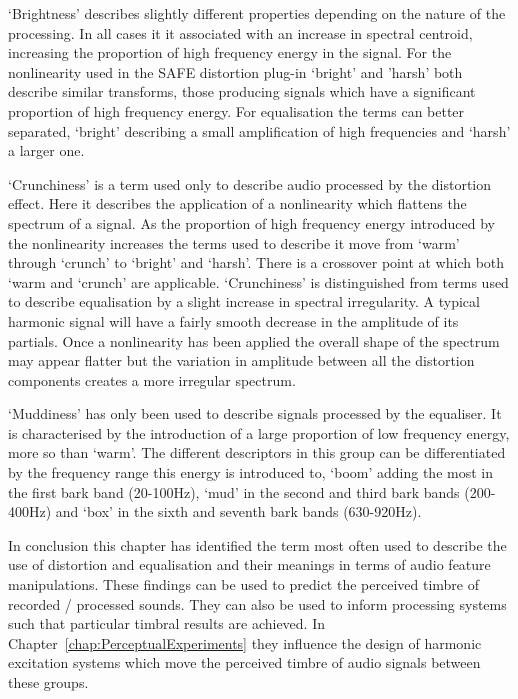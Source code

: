 	`Brightness' describes slightly different properties depending on the nature of the processing. In all cases it it
	associated with an increase in spectral centroid, increasing the proportion of high frequency energy in the signal.
	For the nonlinearity used in the SAFE distortion plug-in `bright' and 'harsh' both describe similar transforms,
	those producing signals which have a significant proportion of high frequency energy. For equalisation the terms
	can better separated, `bright' describing a small amplification of high frequencies and `harsh' a larger one.

	`Crunchiness' is a term used only to describe audio processed by the distortion effect. Here it describes the
	application of a nonlinearity which flattens the spectrum of a signal. As the proportion of high frequency energy
	introduced by the nonlinearity increases the terms used to describe it move from `warm' through `crunch' to
	`bright' and `harsh'. There is a crossover point at which both `warm and `crunch' are applicable. `Crunchiness' is
	distinguished from terms used to describe equalisation by a slight increase in spectral irregularity. A typical
	harmonic signal will have a fairly smooth decrease in the amplitude of its partials. Once a nonlinearity has been
	applied the overall shape of the spectrum may appear flatter but the variation in amplitude between all the
	distortion components creates a more irregular spectrum.

	`Muddiness' has only been used to describe signals processed by the equaliser. It is characterised by the
	introduction of a large proportion of low frequency energy, more so than `warm'. The different descriptors in this
	group can be differentiated by the frequency range this energy is introduced to, `boom' adding the most in the
	first bark band (20-100Hz), `mud' in the second and third bark bands (200-400Hz) and `box' in the sixth and seventh
	bark bands (630-920Hz).

	In conclusion this chapter has identified the term most often used to describe the use of distortion and
	equalisation and their meanings in terms of audio feature manipulations. These findings can be used to predict the
	perceived timbre of recorded / processed sounds. They can also be used to inform processing systems such that
	particular timbral results are achieved. In Chapter~\ref{chap:PerceptualExperiments} they influence the design of
	harmonic excitation systems which move the perceived timbre of audio signals between these groups.
